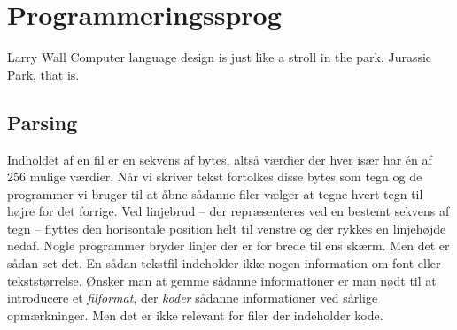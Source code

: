 \chapter{Programmeringssprog}
\label{sec:lang}

\begin{inspiration}{Larry Wall}
Computer language design is just like a stroll in the park. Jurassic Park, that is.
\end{inspiration}



\section{Parsing}

Indholdet af en fil er en sekvens af bytes, altså værdier der hver især har én af 256 mulige værdier. Når vi skriver tekst fortolkes disse bytes som tegn og de programmer vi bruger til at åbne sådanne filer vælger at tegne hvert tegn til højre for det forrige. Ved linjebrud -- der repræsenteres ved en bestemt sekvens af tegn -- flyttes den horisontale position helt til venstre og der rykkes en linjehøjde nedaf. Nogle programmer bryder linjer der er for brede til ens skærm. Men det er sådan set det. En sådan tekstfil indeholder ikke nogen information om font eller tekststørrelse. Ønsker man at gemme sådanne informationer er man nødt til at introducere et \textsl{filformat}, der \textsl{koder} sådanne informationer ved sårlige opmærkninger. Men det er ikke relevant for filer der indeholder kode.

